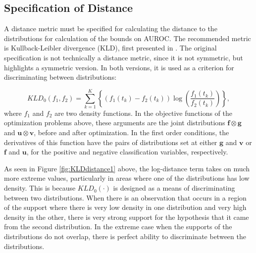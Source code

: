 \subsection{Specification of Distance}


A distance metric must be specified for calculating the distance to the distributions for calculation of the bounds on AUROC.
%
%
The recommended metric is Kullback-Leibler divergence (KLD), first presented in \citet{kullbackliebler1951}.
%
The original specification is not technically a distance metric, since it is not symmetric, but \citet{bigi2003chapter} highlights a symmetric version.
%
In both versions, it is used as a criterion for discriminating between distributions:



\begin{equation}
    KLD_0(f_1, f_2) = \sum_{k = 1}^{K} \left\{ \left( f_1(t_k) - f_2(t_k) \right)
        \log \left( \frac{f_1(t_k)}{f_2(t_k)} \right) \right\},
\end{equation}
%
\noindent where $f_1$ and $f_2$ are two density functions.
In the objective functions of the optimization problems above, these arguments are the joint distributions
$\mathbf{f} \otimes \mathbf{g}$ and $\mathbf{u} \otimes \mathbf{v}$, before and after optimization.
In the first order conditions, the derivatives of this function have the pairs of distributions set at either
$\mathbf{g}$ and $\mathbf{v}$ or $\mathbf{f}$ and $\mathbf{u}$,
for the positive and negative classification variables, respectively.



As seen in Figure \ref{fig:KLDdistance1} above, the log-distance term takes on much more extreme values, particularly in areas where one of the distributions has low density.
This is because $KLD_0(\cdot)$ is designed as a means of discriminating between two distributions.
When there is an observation that occurs in a region of the support where there is very low density in one distribution and very high density in the other, there is very strong support for the hypothesis that it came from the second distribution.
In the extreme case when the supports of the distributions do not overlap, there is perfect ability to discriminate between the distributions.

